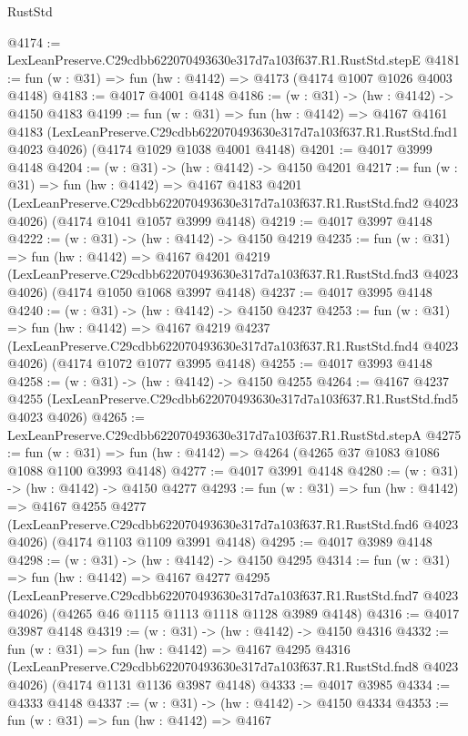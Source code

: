 \begin{lexlean}{RustStd}
\begin{coremodule}
@4174 := LexLeanPreserve.C29cdbb622070493630e317d7a103f637.R1.RustStd.stepE
@4181 := fun (w : @31) => fun (hw : @4142) => @4173 (@4174 @1007 @1026 @4003 @4148)
@4183 := @4017 @4001 @4148
@4186 := (w : @31) -> (hw : @4142) -> @4150 @4183
@4199 := fun (w : @31) =>
  fun (hw : @4142) =>
  @4167
    @4161
    @4183
    (LexLeanPreserve.C29cdbb622070493630e317d7a103f637.R1.RustStd.fnd1 @4023 @4026)
    (@4174 @1029 @1038 @4001 @4148)
@4201 := @4017 @3999 @4148
@4204 := (w : @31) -> (hw : @4142) -> @4150 @4201
@4217 := fun (w : @31) =>
  fun (hw : @4142) =>
  @4167
    @4183
    @4201
    (LexLeanPreserve.C29cdbb622070493630e317d7a103f637.R1.RustStd.fnd2 @4023 @4026)
    (@4174 @1041 @1057 @3999 @4148)
@4219 := @4017 @3997 @4148
@4222 := (w : @31) -> (hw : @4142) -> @4150 @4219
@4235 := fun (w : @31) =>
  fun (hw : @4142) =>
  @4167
    @4201
    @4219
    (LexLeanPreserve.C29cdbb622070493630e317d7a103f637.R1.RustStd.fnd3 @4023 @4026)
    (@4174 @1050 @1068 @3997 @4148)
@4237 := @4017 @3995 @4148
@4240 := (w : @31) -> (hw : @4142) -> @4150 @4237
@4253 := fun (w : @31) =>
  fun (hw : @4142) =>
  @4167
    @4219
    @4237
    (LexLeanPreserve.C29cdbb622070493630e317d7a103f637.R1.RustStd.fnd4 @4023 @4026)
    (@4174 @1072 @1077 @3995 @4148)
@4255 := @4017 @3993 @4148
@4258 := (w : @31) -> (hw : @4142) -> @4150 @4255
@4264 := @4167
    @4237
    @4255
    (LexLeanPreserve.C29cdbb622070493630e317d7a103f637.R1.RustStd.fnd5 @4023 @4026)
@4265 := LexLeanPreserve.C29cdbb622070493630e317d7a103f637.R1.RustStd.stepA
@4275 := fun (w : @31) => fun (hw : @4142) => @4264 (@4265 @37 @1083 @1086 @1088 @1100 @3993 @4148)
@4277 := @4017 @3991 @4148
@4280 := (w : @31) -> (hw : @4142) -> @4150 @4277
@4293 := fun (w : @31) =>
  fun (hw : @4142) =>
  @4167
    @4255
    @4277
    (LexLeanPreserve.C29cdbb622070493630e317d7a103f637.R1.RustStd.fnd6 @4023 @4026)
    (@4174 @1103 @1109 @3991 @4148)
@4295 := @4017 @3989 @4148
@4298 := (w : @31) -> (hw : @4142) -> @4150 @4295
@4314 := fun (w : @31) =>
  fun (hw : @4142) =>
  @4167
    @4277
    @4295
    (LexLeanPreserve.C29cdbb622070493630e317d7a103f637.R1.RustStd.fnd7 @4023 @4026)
    (@4265 @46 @1115 @1113 @1118 @1128 @3989 @4148)
@4316 := @4017 @3987 @4148
@4319 := (w : @31) -> (hw : @4142) -> @4150 @4316
@4332 := fun (w : @31) =>
  fun (hw : @4142) =>
  @4167
    @4295
    @4316
    (LexLeanPreserve.C29cdbb622070493630e317d7a103f637.R1.RustStd.fnd8 @4023 @4026)
    (@4174 @1131 @1136 @3987 @4148)
@4333 := @4017 @3985
@4334 := @4333 @4148
@4337 := (w : @31) -> (hw : @4142) -> @4150 @4334
@4353 := fun (w : @31) =>
  fun (hw : @4142) =>
  @4167

\end{coremodule}
\end{lexlean}
